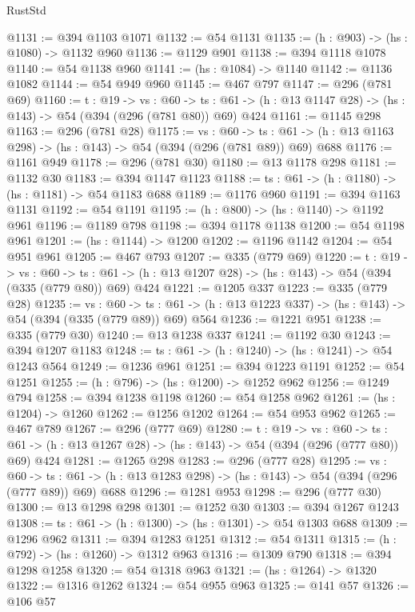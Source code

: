 \begin{lexlean}{RustStd}
\begin{coremodule}
{\begin{coremodule}
{{{{{{{{@1131 := @394 @1103 @1071
@1132 := @54 @1131
@1135 := (h : @903) -> (hs : @1080) -> @1132 @960
@1136 := @1129 @901
@1138 := @394 @1118 @1078
@1140 := @54 @1138 @960
@1141 := (hs : @1084) -> @1140
@1142 := @1136 @1082
@1144 := @54 @949 @960
@1145 := @467 @797
@1147 := @296 (@781 @69)
@1160 := {t : @19} ->
  {vs : @60} ->
  {ts : @61} -> (h : @13 @1147 @28) -> (hs : @143) -> @54 (@394 (@296 (@781 @80)) @69) @424
@1161 := @1145 @298
@1163 := @296 (@781 @28)
@1175 := {vs : @60} ->
  {ts : @61} -> (h : @13 @1163 @298) -> (hs : @143) -> @54 (@394 (@296 (@781 @89)) @69) @688
@1176 := @1161 @949
@1178 := @296 (@781 @30)
@1180 := @13 @1178 @298
@1181 := @1132 @30
@1183 := @394 @1147 @1123
@1188 := {ts : @61} -> (h : @1180) -> (hs : @1181) -> @54 @1183 @688
@1189 := @1176 @960
@1191 := @394 @1163 @1131
@1192 := @54 @1191
@1195 := (h : @800) -> (hs : @1140) -> @1192 @961
@1196 := @1189 @798
@1198 := @394 @1178 @1138
@1200 := @54 @1198 @961
@1201 := (hs : @1144) -> @1200
@1202 := @1196 @1142
@1204 := @54 @951 @961
@1205 := @467 @793
@1207 := @335 (@779 @69)
@1220 := {t : @19} ->
  {vs : @60} ->
  {ts : @61} -> (h : @13 @1207 @28) -> (hs : @143) -> @54 (@394 (@335 (@779 @80)) @69) @424
@1221 := @1205 @337
@1223 := @335 (@779 @28)
@1235 := {vs : @60} ->
  {ts : @61} -> (h : @13 @1223 @337) -> (hs : @143) -> @54 (@394 (@335 (@779 @89)) @69) @564
@1236 := @1221 @951
@1238 := @335 (@779 @30)
@1240 := @13 @1238 @337
@1241 := @1192 @30
@1243 := @394 @1207 @1183
@1248 := {ts : @61} -> (h : @1240) -> (hs : @1241) -> @54 @1243 @564
@1249 := @1236 @961
@1251 := @394 @1223 @1191
@1252 := @54 @1251
@1255 := (h : @796) -> (hs : @1200) -> @1252 @962
@1256 := @1249 @794
@1258 := @394 @1238 @1198
@1260 := @54 @1258 @962
@1261 := (hs : @1204) -> @1260
@1262 := @1256 @1202
@1264 := @54 @953 @962
@1265 := @467 @789
@1267 := @296 (@777 @69)
@1280 := {t : @19} ->
  {vs : @60} ->
  {ts : @61} -> (h : @13 @1267 @28) -> (hs : @143) -> @54 (@394 (@296 (@777 @80)) @69) @424
@1281 := @1265 @298
@1283 := @296 (@777 @28)
@1295 := {vs : @60} ->
  {ts : @61} -> (h : @13 @1283 @298) -> (hs : @143) -> @54 (@394 (@296 (@777 @89)) @69) @688
@1296 := @1281 @953
@1298 := @296 (@777 @30)
@1300 := @13 @1298 @298
@1301 := @1252 @30
@1303 := @394 @1267 @1243
@1308 := {ts : @61} -> (h : @1300) -> (hs : @1301) -> @54 @1303 @688
@1309 := @1296 @962
@1311 := @394 @1283 @1251
@1312 := @54 @1311
@1315 := (h : @792) -> (hs : @1260) -> @1312 @963
@1316 := @1309 @790
@1318 := @394 @1298 @1258
@1320 := @54 @1318 @963
@1321 := (hs : @1264) -> @1320
@1322 := @1316 @1262
@1324 := @54 @955 @963
@1325 := @141 @57
@1326 := @106 @57
}}}}}}}}
\end{coremodule}}
\end{coremodule}
\end{lexlean}
